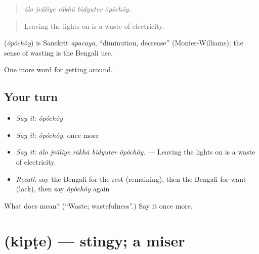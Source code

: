 \begin{quote}
    
\end{quote}

\begin{quote}
\emph{ālo jvāliye rākhā bidyuter ôpôchôy.}
\end{quote}

\begin{quote}
Leaving the lights on is a waste of electricity.
\end{quote}

\begin{cousinweb}
\textbf{} (\emph{ôpôchôy}) is Sanskrit \emph{apacaya}, \textquotedblleft{}diminution, decrease\textquotedblright{} (Monier-Williams); the sense of wasting is the Bengali use.
\end{cousinweb}

\begin{grammarlens}[title={What you've built}]
One more word for getting around.
\end{grammarlens}

\subsection*{Your turn}
\begin{itemize}
\raggedright
  \item \emph{Say it:} \emph{ôpôchôy}
  \item \emph{Say it:} \emph{ôpôchôy}, once more
  \item \emph{Say it:} \emph{ālo jvāliye rākhā bidyuter ôpôchôy.} — Leaving the lights on is a waste of electricity.
  \item \emph{Recall:} say the Bengali for the rest (remaining), then the Bengali for want (lack), then say \emph{ôpôchôy} again
\end{itemize}

\begin{tcolorbox}[breakable,colback=teal!4,colframe=teal!35!black,title={Before you move on}]
What does  mean? (\textquotedblleft{}Waste; wastefulness\textquotedblright{}.) Say it once more.
\end{tcolorbox}
\section[\texorpdfstring{\bn{কিপটে} (kipṭe)}{কিপটে (kipṭe)}]{ (kipṭe) — stingy; a miser}

\label{lesson:BN-C419-kipte}



